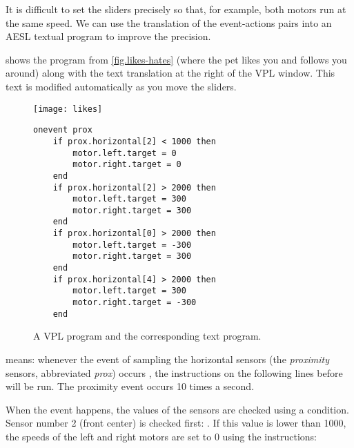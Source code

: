 \label{a.tech}


It is difficult to set the sliders precisely so that, for example, both
motors run at the same speed. We can use the translation of the
event-actions pairs into an AESL textual program to improve the
precision.


 shows the program from
\cref{fig.likes-hates} (where the pet likes you and follows you around)
along with the text translation at the right of the VPL window. This
text is modified automatically as you move the sliders.

\begin{figure}[hbt]
\texttt{[image: likes]}
\hfill
\begin{minipage}[b]{0.55\textwidth}
\begin{footnotesize}
\begin{verbatim}
onevent prox
    if prox.horizontal[2] < 1000 then
        motor.left.target = 0
        motor.right.target = 0
    end
    if prox.horizontal[2] > 2000 then
        motor.left.target = 300
        motor.right.target = 300
    end
    if prox.horizontal[0] > 2000 then
        motor.left.target = -300
        motor.right.target = 300
    end
    if prox.horizontal[4] > 2000 then
        motor.left.target = 300
        motor.right.target = -300
    end
\end{verbatim}
\end{footnotesize}
\vspace*{8ex}
\end{minipage}
\caption{A VPL program and the corresponding text program.}
\label{fig.textcode}
\end{figure}

 means: whenever the event of sampling the horizontal
sensors (the \emph{proximity} sensors, abbreviated \emph{prox})
occurs , the instructions on the following lines before  will be
run. The proximity event occurs 10 times a second.

When the event happens, the values of the sensors are checked using a
condition. Sensor number 2 (front center) is checked first:
. If this value is lower than 1000, the speeds of
the left and right motors are set to 0 using the instructions:

